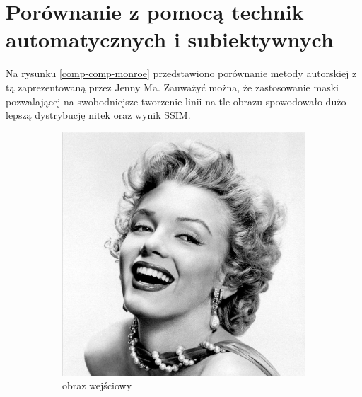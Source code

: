 \documentclass[a4paper, 12pt, polish, twoside]{extreport}
\begin{document}
\section{Porównanie z pomocą technik automatycznych i subiektywnych} \label{comp-comp}
	Na rysunku \ref{comp-comp-monroe} przedstawiono porównanie metody autorskiej z tą zaprezentowaną przez Jenny Ma. Zauważyć można, że zastosowanie maski pozwalającej na swobodniejsze tworzenie linii na tle obrazu spowodowało dużo lepszą dystrybucję nitek oraz wynik SSIM.
	\begin{figure}[H] 
    \centering
    \begin{subfigure}{0.40\textwidth}
        \centering
        \includegraphics[width = \textwidth]{img/6-comp/monroe-portrait_original_c10_inv0.png}
        \caption{obraz wejściowy}
        \label{comp-comp-monroe-a}
    \end{subfigure}
    \begin{subfigure}{0.40\textwidth}
        \centering

\end{subfigure}
\end{figure}
\end{document}
